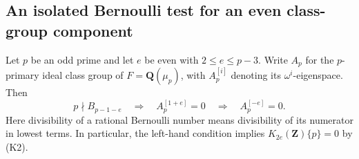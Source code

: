 \subsection{An isolated Bernoulli test for an even class-group component}
\label{sec:isolated-reflection}

\begin{lemma}[K17-REFLECTOR]\label{lem:isolated-reflection}
Let $p$ be an odd prime and let $e$ be even with $2\le e\le p-3$.
Write $A_p$ for the $p$-primary ideal class group of
$F=\mathbf Q(\mu_p)$, with $A_p^{[i]}$ denoting its
$\omega^i$-eigenspace. Then
\[
 p\nmid B_{p-1-e}
 \quad\Longrightarrow\quad A_p^{[1+e]}=0
 \quad\Longrightarrow\quad A_p^{[-e]}=0.
 \tag{RB.1}
\]
Here divisibility of a rational Bernoulli number means divisibility of
its numerator in lowest terms. In particular, the left-hand condition
implies $K_{2e}(\mathbf Z)\{p\}=0$ by (K2).
\end{lemma}

